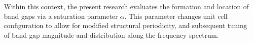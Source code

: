 Within this context, the present research evaluates the formation and location of band gaps via a saturation parameter $\alpha$. This parameter changes unit cell configuration to allow for modified structural periodicity, and subsequent tuning of band gap magnitude and distribution along the frequency spectrum. 

